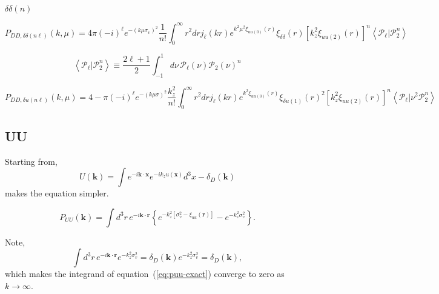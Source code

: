 \documentclass[a4paper,11pt, fleqn]{article}
\begin{document}
$\delta\delta(n)$

\begin{equation}
  P_{DD, \delta\delta (n\ell)}(k, \mu) =
  4\pi (-i)^\ell e^{-(k\mu\sigma_v)^2}
  \frac{1}{n!} \int_0^\infty \! r^2 dr j_\ell(kr) e^{k^2\mu^2 \xi_{uu(0)}(r)}
  \xi_{\delta\delta}(r)
  \left[ k_z^2 \xi_{uu(2)}(r) \right]^n
  \left\langle \mathcal{P}_\ell | \mathcal{P}_2^n \right\rangle
\end{equation}

\begin{equation}
  \left\langle \mathcal{P}_\ell | \mathcal{P}_2^n \right\rangle
  \equiv
  \frac{2\ell + 1}{2} \int_{-1}^1 \!d\nu \,
  \mathcal{P}_\ell(\nu) \mathcal{P}_2(\nu)^n
\end{equation}

\begin{equation}
  P_{DD, \delta u (n\ell)}(k, \mu) =
  4-\pi (-i)^\ell e^{-(k\mu\sigma)^2}
  \frac{k_z^2}{n!} \int_0^\infty \! r^2 dr j_\ell(kr) e^{k^2 \xi_{uu(0)}(r)}
  \xi_{\delta u (1)}(r)^2
  \left[ k_z^2 \xi_{uu(2)}(r) \right]^n
  \left\langle \mathcal{P}_\ell | \nu^2 \mathcal{P}_2^n\right\rangle
\end{equation}

\clearpage
\subsection{UU}

Starting from,
%
\begin{equation}
  U(\bm{k}) = \int \! e^{-i\bm{k}\cdot\bm{x}} e^{-ik_zu(\bm{x})} d^3 x
  - \delta_D(\bm{k})
\end{equation}
%
makes the equation simpler.

\begin{equation}
  \label{eq:puu-exact}
  P_{UU}(\bm{k}) = \int\!\! d^3 r \, e^{-i\bm{k}\cdot\bm{r}}\left\{
  e^{-k_z^2 \left[ \sigma_v^2 - \xi_{uu}(\bm{r}) \right]} - e^{-k_z^2 \sigma_v^2}
  \right\}.
\end{equation}

Note,
%
\begin{equation}
  \int\! d^3 r \, e^{-i\bm{k}\cdot\bm{r}} e^{-k_z^2 \sigma_v^2}
  = \delta_D(\bm{k}) e^{-k_z^2 \sigma_v^2} = \delta_D(\bm{k}),
\end{equation}
%
which makes the integrand of equation~(\ref{eq:puu-exact}) converge to
zero as $k \rightarrow \infty$.

\clearpage
%
%
\appendix

\sectionfont{\sffamily\Huge\color{Blue}\selectfont}
\subsectionfont{\sffamily\color{Blue}\selectfont}
\subsubsectionfont{\sffamily\color{Blue}\selectfont}
\paragraphfont{\sffamily\color{Blue}\selectfont}
\end{document}
